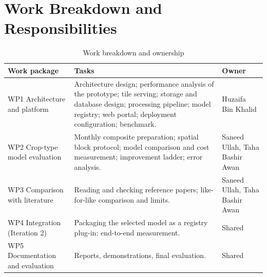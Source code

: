\section{Work Breakdown and Responsibilities}
\begin{table}[htbp]
\centering\small
\caption{Work breakdown and ownership}
\label{tab:wbs}
\begin{tabularx}{\textwidth}{L{3.4cm} Y L{3.5cm}}
\toprule
\textbf{Work package} & \textbf{Tasks} & \textbf{Owner}\\
\midrule
WP1 Architecture and platform & Architecture design; performance analysis of the prototype; tile serving; storage and database design; processing pipeline; model registry; web portal; deployment configuration; benchmark. & Huzaifa Bin Khalid\\
WP2 Crop-type model evaluation & Monthly composite preparation; spatial block protocol; model comparison and cost measurement; improvement ladder; error analysis. & Saneed Ullah, Taha Bashir Awan\\
WP3 Comparison with literature & Reading and checking reference papers; like-for-like comparison and limits. & Saneed Ullah, Taha Bashir Awan\\
WP4 Integration (Iteration 2) & Packaging the selected model as a registry plug-in; end-to-end measurement. & Shared\\
WP5 Documentation and evaluation & Reports, demonstrations, final evaluation. & Shared\\
\bottomrule
\end{tabularx}
\end{table}


